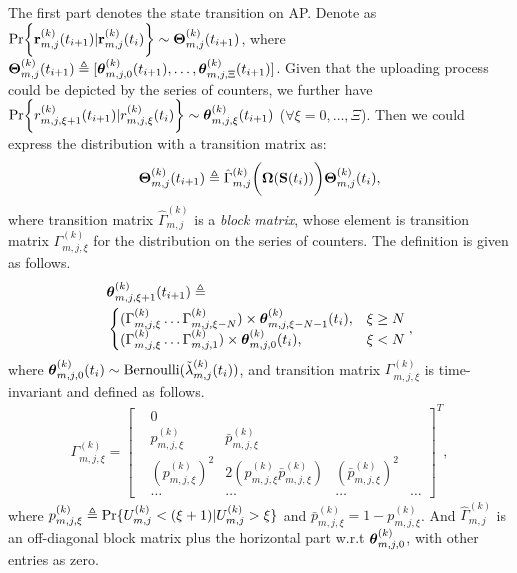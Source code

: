 The first part denotes the state transition on AP.
Denote as $\Pr\Brace{\vec{r}^{(k)}_{m,j}(t_{i+1})|\vec{r}^{(k)}_{m,j}(t_{i})} \sim \vecG{\Theta}^{(k)}_{m,j}(t_{i+1})$, where $\boldsymbol{\Theta}^{(k)}_{m,j}(t_{i+1}) \triangleq [\boldsymbol{\theta}^{(k)}_{m,j,0}(t_{i+1}), \dots, \boldsymbol{\theta}^{(k)}_{m,j,\Xi}(t_{i+1})]$.
Given that the uploading process could be depicted by the series of counters, we further have
$\Pr\Brace{r^{(k)}_{m,j,\xi+1}(t_{i+1})|r^{(k)}_{m,j,\xi}(t_{i})} \sim \vecG{\theta}^{(k)}_{m,j,\xi}(t_{i+1})$ ($\forall \xi=0,\dots,\Xi$).
Then we could express the distribution with a transition matrix as:
\begin{align}
    \boldsymbol{\Theta}^{(k)}_{m,j}(t_{i+1}) \triangleq \hat{\Gamma}^{(k)}_{m,j}\bigg(\boldsymbol{\Omega}(\mathbf{S}(t_i)) \bigg)\boldsymbol{\Theta}^{(k)}_{m,j}(t_{i}),
\end{align}
where transition matrix $\hat{\Gamma}^{(k)}_{m,j}$ is a \emph{block matrix}, whose element is transition matrix $\Gamma^{(k)}_{m,j,\xi}$ for the distribution on the series of counters. The definition is given as follows.
\begin{align}
    &\boldsymbol{\theta}^{(k)}_{m,j,\xi+1}(t_{i+1}) \triangleq
    \nonumber\\
    &\begin{cases}
        ( \Gamma^{(k)}_{m,j,\xi} \dots \Gamma^{(k)}_{m,j,\xi-N} ) \times \boldsymbol{\theta}^{(k)}_{m,j,\xi-N-1}(t_i), &{\xi \geq N}
        \\
        ( \Gamma^{(k)}_{m,j,\xi} \dots \Gamma^{(k)}_{m,j,1} ) \times \boldsymbol{\theta}^{(k)}_{m,j,0}(t_i), &{\xi < N}
    \end{cases},
\end{align}
where $\boldsymbol{\theta}^{(k)}_{m,j,0}(t_{i}) \sim \text{Bernoulli}(\tilde{\lambda}^{(k)}_{m,j}(t_i))$, and transition matrix $\Gamma^{(k)}_{m,j,\xi}$ is time-invariant and defined as follows.
\begin{align}
    \Gamma^{(k)}_{m,j,\xi} = 
    \begin{bmatrix}
        &0 \\
        &p^{(k)}_{m,j,\xi} &\bar{p}^{(k)}_{m,j,\xi} \\
        &(p^{(k)}_{m,j,\xi})^2 &2(p^{(k)}_{m,j,\xi}\bar{p}^{(k)}_{m,j,\xi}) &(\bar{p}^{(k)}_{m,j,\xi})^2 \\
        &\dots &\dots &\dots &\dots
    \end{bmatrix}^T,
\end{align}
where $p^{(k)}_{m,j,\xi} \triangleq \Pr\{U^{(k)}_{m,j} < (\xi+1) | U^{(k)}_{m,j}>\xi\}$ and $\bar{p}^{(k)}_{m,j,\xi} = 1 - p^{(k)}_{m,j,\xi}$.
And $\hat{\Gamma}^{(k)}_{m,j}$ is an off-diagonal block matrix plus the horizontal part w.r.t $\boldsymbol{\theta}^{(k)}_{m,j,0}$, with other entries as zero.

